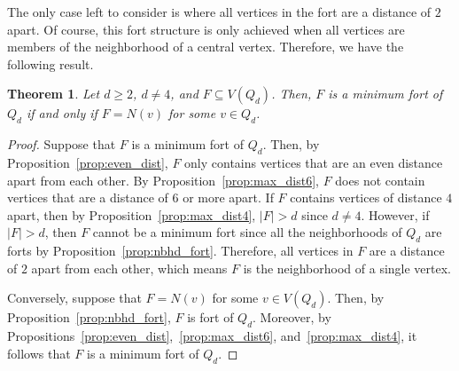 \documentclass[twoside, 12pt]{article}
\newtheorem{theorem}{Theorem}[section]
\theoremstyle{definition}
\newcommand\abs[1]{\left|#1\right|}
\begin{document}
The only case left to consider is where all vertices in the fort are a distance of $2$ apart.
Of course, this fort structure is only achieved when all vertices are members of the neighborhood of a central vertex. 
Therefore, we have the following result.
\begin{theorem}\label{thm:min_fort}
Let $d\geq 2$, $d\neq 4$, and $F\subseteq V(Q_{d})$.
Then, $F$ is a minimum fort of $Q_{d}$ if and only if $F=N(v)$ for some $v\in Q_{d}$. 
\end{theorem}
\begin{proof}
Suppose that $F$ is a minimum fort of $Q_{d}$.
Then, by Proposition~\ref{prop:even_dist}, $F$ only contains vertices that are an even distance apart from each other. 
By Proposition~\ref{prop:max_dist6}, $F$ does not contain vertices that are a distance of $6$ or more apart. 
If $F$ contains vertices of distance $4$ apart, then by Proposition~\ref{prop:max_dist4}, $\abs{F}>d$ since $d\neq 4$. 
However, if $\abs{F}>d$, then $F$ cannot be a minimum fort since all the neighborhoods of $Q_{d}$ are forts by Proposition~\ref{prop:nbhd_fort}. 
Therefore, all vertices in $F$ are a distance of $2$ apart from each other, which means $F$ is the neighborhood of a single vertex. 

Conversely, suppose that $F=N(v)$ for some $v\in V(Q_{d})$.
Then, by Proposition~\ref{prop:nbhd_fort}, $F$ is fort of $Q_{d}$.
Moreover, by Propositions~\ref{prop:even_dist},~\ref{prop:max_dist6}, and~\ref{prop:max_dist4}, it follows that $F$ is a minimum fort of $Q_{d}$.
\end{proof}
\end{document}
